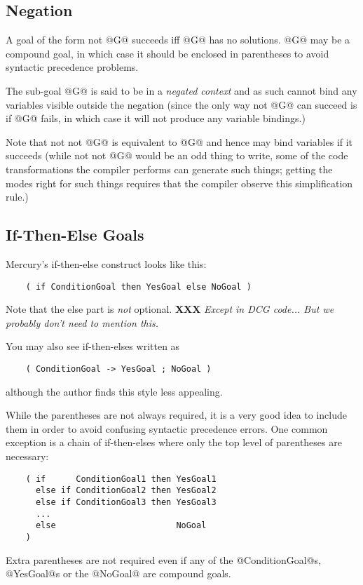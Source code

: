 \documentclass[a4paper,11pt,notitlepage,onecolumn]{article}
\newcommand{\XXX}[1]%
{{\small\textbf{XXX} \emph{#1}}}
\begin{document}
\subsection{Negation}

A goal of the form not @G@ succeeds iff @G@ has no solutions.  @G@
may be a compound goal, in which case it should be enclosed in
parentheses to avoid syntactic precedence problems.

The sub-goal @G@ is said to be in a \emph{negated context} and as
such cannot bind any variables visible outside the negation
(since the only way not @G@ can succeed is if @G@ fails, in which
case it will not produce any variable bindings.)

Note that not not @G@ is equivalent to @G@ and hence may bind
variables if it succeeds (while not not @G@ would be an odd
thing to write, some of the code transformations the compiler
performs can generate such things; getting the modes right for
such things requires that the compiler observe this
simplification rule.)

\subsection{If-Then-Else Goals}

Mercury's if-then-else construct looks like this:
\begin{verbatim}
    ( if ConditionGoal then YesGoal else NoGoal )
\end{verbatim}
Note that the else part is \emph{not} optional.  \XXX{Except in DCG
code...  But we probably don't need to mention this.}

You may also see if-then-elses written as
\begin{verbatim}
    ( ConditionGoal -> YesGoal ; NoGoal )
\end{verbatim}
although the author finds this style less appealing.

While the parentheses are not always required, it is a very
good idea to include them in order to avoid confusing
syntactic precedence errors.  One common exception is a chain
of if-then-elses where only the top level of parentheses are
necessary:
\begin{verbatim}
    ( if      ConditionGoal1 then YesGoal1
      else if ConditionGoal2 then YesGoal2
      else if ConditionGoal3 then YesGoal3
      ...
      else                        NoGoal
    )
\end{verbatim}
Extra parentheses are not required even if any of the @ConditionGoal@s,
@YesGoal@s or the @NoGoal@ are compound goals.
\end{document}
